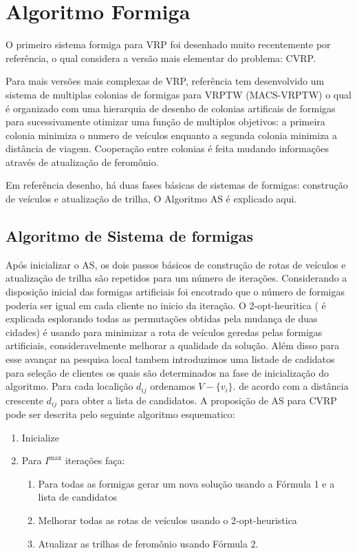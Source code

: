 \documentclass[a4paper, 12pt]{article}
\begin{document}
\section{Algoritmo Formiga}

 O primeiro sistema formiga para VRP foi desenhado muito recentemente por {\color{red} referência},
o qual considera a versão mais elementar do problema: CVRP.

 Para mais versões mais complexas de VRP, {\color{red} referência} tem desenvolvido um sistema de
multiplas colonias de formigas para VRPTW (MACS-VRPTW) o qual é organizado com uma hierarquia de
desenho de colonias artificais de formigas para sucessivamente otimizar uma função de multiplos
objetivos: a primeira colonia minimiza o numero de veículos enquanto a segunda colonia minimiza a
distância de viagem. Cooperação entre colonias é feita mudando informações através de atualização de
feromônio.

 Em {\color{red} referência} desenho, há duas fases básicas de sistemas de formigas: construção de
veículos e atualização de trilha, O Algoritmo AS é explicado aqui.

\subsection{ Algoritmo de Sistema de formigas}

 Após inicializar o AS, os dois passos básicos de construção de rotas de veículos e atualização de
trilha são repetidos para um número de iterações. Considerando a disposição inicial das formigas
artificiais foi encotrado que o número de formigas poderia ser igual em cada cliente no inicio da
iteração. O 2-opt-heuritica ( é explicada esplorando todas as permutações obtidas pela mudança de
duas cidades) é usando para minimizar a rota de veículos geredas pelas formigas artificiais,
consideravelmente melhorar a qualidade da solução. Além disso para esse avançar na pesquisa local
tambem introduzimos uma listade de cadidatos para seleção de clientes os quais são determinados na
fase de inicialização do algoritmo. Para cada localição $d_{ij}$ ordenamos $V-\{v_i\}$. de acordo
com a distância crescente $d_{ij}$ para obter a lista de candidatos. A proposição de AS para CVRP
pode ser descrita pelo seguinte algoritmo esquematico:

\begin{enumerate}
\item Inicialize
\item Para $I^{\max}$ iterações faça:

\begin{enumerate}
\item Para todas as formigas gerar um nova solução usando a Fórmula 1 e a lista de candidatos
\item Melhorar todas as rotas de veículos usando o 2-opt-heuristica
\item Atualizar as trilhas de feromônio usando Fórmula 2.
\end{enumerate}
\end{enumerate}
\end{document}
